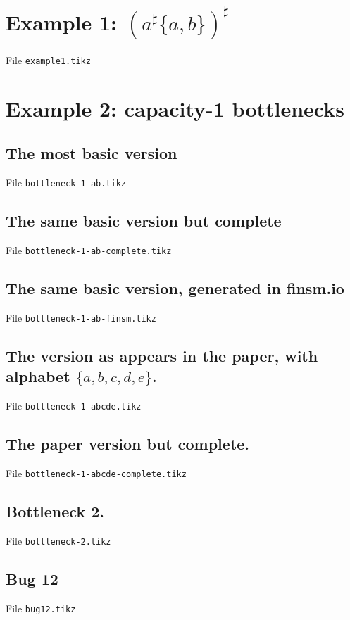\documentclass{article}
\begin{document}
\section{Example 1: $(a^\sharp\{a,b\})^\sharp$} 
%
File {\tt example1.tikz}

 



\section{Example 2: capacity-1 bottlenecks}

\subsection{The most basic version}

File {\tt bottleneck-1-ab.tikz}

 

\subsection{The same basic version but complete}

File {\tt bottleneck-1-ab-complete.tikz}

 

\subsection{The same basic version, generated in finsm.io}

File {\tt bottleneck-1-ab-finsm.tikz}

 

\subsection{The version as appears in the paper, with alphabet $\{a,b,c,d,e\}$.}

File {\tt bottleneck-1-abcde.tikz}

 

\subsection{The paper version but complete.}

File {\tt bottleneck-1-abcde-complete.tikz}

 

\subsection{Bottleneck 2.}

File {\tt bottleneck-2.tikz}

 

\subsection{Bug 12}

File {\tt bug12.tikz}

 
\end{document}
